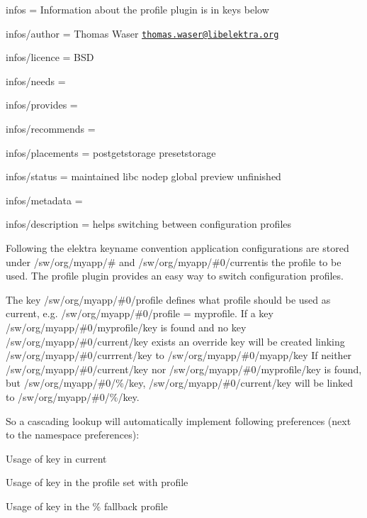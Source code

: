 
\begin{DoxyItemize}
\item infos = Information about the profile plugin is in keys below
\item infos/author = Thomas Waser \href{mailto:thomas.waser@libelektra.org}{\tt thomas.\+waser@libelektra.\+org}
\item infos/licence = B\+SD
\item infos/needs =
\item infos/provides =
\item infos/recommends =
\item infos/placements = postgetstorage presetstorage
\item infos/status = maintained libc nodep global preview unfinished
\item infos/metadata =
\item infos/description = helps switching between configuration profiles
\end{DoxyItemize}

Following the elektra keyname convention application configurations are stored under {\ttfamily /sw/org/myapp/\#} and {\ttfamily /sw/org/myapp/\#0/current}is the profile to be used. The {\ttfamily profile} plugin provides an easy way to switch configuration profiles.

The key {\ttfamily /sw/org/myapp/\#0/profile} defines what profile should be used as {\ttfamily current}, e.\+g. {\ttfamily /sw/org/myapp/\#0/profile = myprofile}. If a key {\ttfamily /sw/org/myapp/\#0/myprofile/key} is found and no key {\ttfamily /sw/org/myapp/\#0/current/key} exists an override key will be created linking {\ttfamily /sw/org/myapp/\#0/currrent/key} to {\ttfamily /sw/org/myapp/\#0/myapp/key} If neither {\ttfamily /sw/org/myapp/\#0/current/key} nor {\ttfamily /sw/org/myapp/\#0/myprofile/key} is found, but {\ttfamily /sw/org/myapp/\#0/\%/key}, {\ttfamily /sw/org/myapp/\#0/current/key} will be linked to {\ttfamily /sw/org/myapp/\#0/\%/key}.

So a cascading lookup will automatically implement following preferences (next to the namespace preferences)\+:


\begin{DoxyEnumerate}
\item Usage of key in {\ttfamily current}
\item Usage of key in the profile set with {\ttfamily profile}
\item Usage of key in the {\ttfamily \%} fallback profile
\end{DoxyEnumerate}

